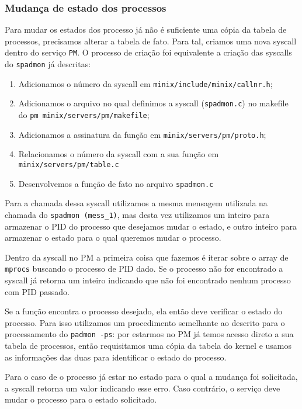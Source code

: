 \documentclass[12pt,journal,compsoc]{IEEEtran}
\begin{document}
\subsubsection{Mudança de estado dos processos}

Para mudar os estados dos processo já não é suficiente uma cópia da tabela de processos, precisamos alterar a tabela de fato. Para tal, criamos uma nova syscall dentro do serviço \texttt{PM}. O processo de criação foi equivalente a criação das syscalls do \texttt{spadmon} já descritas: 

\begin{enumerate}
\item 	Adicionamos o número da syscall em \texttt{minix/include/minix/callnr.h};
\item 	Adicionamos o arquivo no qual definimos a syscall (\texttt{spadmon.c}) no makefile 		   do \texttt{pm minix/servers/pm/makefile}; 
\item	Adicionamos a assinatura da função em \texttt{minix/servers/pm/proto.h};
\item	Relacionamos o número da syscall com a sua função em 						     		 \texttt{minix/servers/pm/table.c}
\item	Desenvolvemos a função de fato no arquivo \texttt{spadmon.c}
\end{enumerate}

Para a chamada dessa syscall utilizamos a mesma mensagem utilizada na chamada do \texttt{spadmon (mess\_1)}, mas desta vez utilizamos um inteiro para armazenar o PID do processo que desejamos mudar o estado, e outro inteiro para armazenar o estado para o qual queremos mudar o processo.

Dentro da syscall no PM a primeira coisa que fazemos é iterar sobre o array de \texttt{mprocs} buscando o processo de PID dado. Se o processo não for encontrado a syscall já retorna um inteiro indicando que não foi encontrado nenhum processo com PID passado.
	
    Se a função encontra o processo desejado, ela então deve verificar o estado do processo. Para isso utilizamos um procedimento semelhante ao descrito para o processamento do \texttt{padmon -ps}: por estarmos no PM já temos acesso direto a sua tabela de processos, então requisitamos uma cópia da tabela do kernel e usamos as informações das duas para identificar o estado do processo.
	
    Para o caso de o processo já estar no estado para o qual a mudança foi solicitada, a syscall retorna um valor indicando esse erro. Caso contrário, o serviço deve mudar o processo para o estado solicitado.
    
\end{document}
